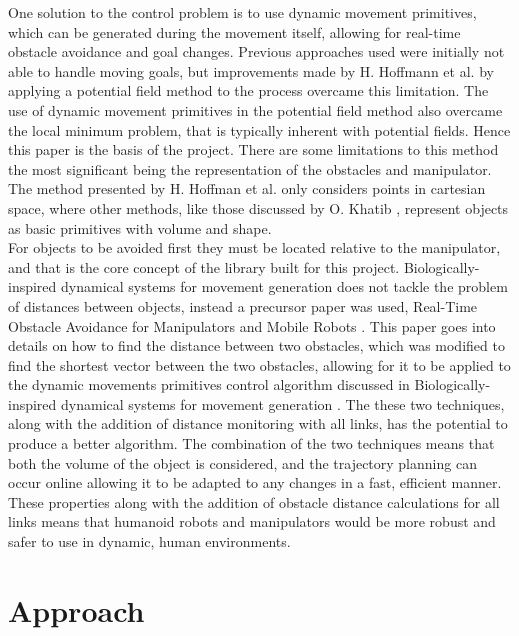 \documentclass[a4paper, 10pt, conference]{ieeeconf}      %
\begin{document}
One solution to the control problem is to use dynamic movement primitives, which can be generated during the movement itself, allowing for real-time obstacle avoidance and goal changes. Previous approaches \cite{Janabi-Sharif} used were initially not able to handle moving goals, but improvements made by H. Hoffmann et al. \cite{Hoffmann} by applying a potential field method to the process overcame this limitation. The use of dynamic movement primitives in the potential field method also overcame the local minimum problem, that is typically inherent with potential fields. Hence this paper is the basis of the project. There are some limitations to this method the most significant being the representation of the obstacles and manipulator. The method presented by H. Hoffman et al.\cite{Hoffmann} only considers points in cartesian space, where other methods, like those discussed by O. Khatib \cite{Khatib}, represent objects as basic primitives with volume and shape. \\

For objects to be avoided first they must be located relative to the manipulator, and that is the core concept of the library built for this project. Biologically-inspired dynamical systems for movement generation \cite{Hoffmann} does not tackle the problem of distances between objects, instead a precursor paper was used, Real-Time Obstacle Avoidance for Manipulators and Mobile Robots \cite{Khatib}. This paper goes into details on how to find the distance between two obstacles, which was modified to find the shortest vector between the two obstacles, allowing for it to be applied to the dynamic movements primitives control algorithm discussed in Biologically-inspired dynamical systems for movement generation \cite{Hoffmann}. The these two techniques, along with the addition of distance monitoring with all links, has the potential to produce a better algorithm. The combination of the two techniques means that both the volume of the object is considered, and the trajectory planning can occur online allowing it to be adapted to any changes in a fast, efficient manner. These properties along with the addition of obstacle distance calculations for all links means that humanoid robots and manipulators would be more robust and safer to use in dynamic, human environments.

\section{Approach}
\end{document}
